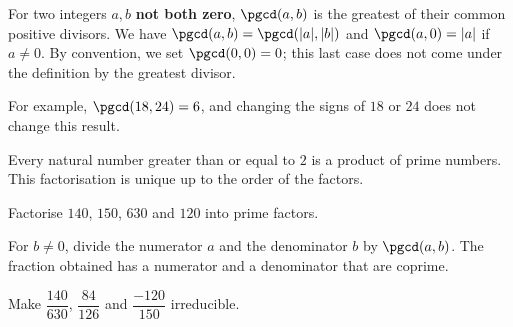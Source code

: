 \begin{keypoint}
For two integers $a,b$ \textbf{not both zero}, $\pgcd(a,b)$ is the greatest of their common positive divisors. We have $\pgcd(a,b)=\pgcd(|a|,|b|)$ and $\pgcd(a,0)=|a|$ if $a\ne0$. By convention, we set $\pgcd(0,0)=0$; this last case does not come under the definition by the greatest divisor.
\end{keypoint}
For example, $\pgcd(18,24)=6$, and changing the signs of $18$ or $24$ does not change this result.
\begin{keypoint}
Every natural number greater than or equal to $2$ is a product of prime numbers. This factorisation is unique up to the order of the factors.
\end{keypoint}
\begin{example}Factorise $140$, $150$, $630$ and $120$ into prime factors.\end{example}
\begin{method}
For $b\ne0$, divide the numerator $a$ and the denominator $b$ by $\pgcd(a,b)$. The fraction obtained has a numerator and a denominator that are coprime.
\end{method}
\begin{example}Make $\dfrac{140}{630}$, $\dfrac{84}{126}$ and $\dfrac{-120}{150}$ irreducible.\end{example}

